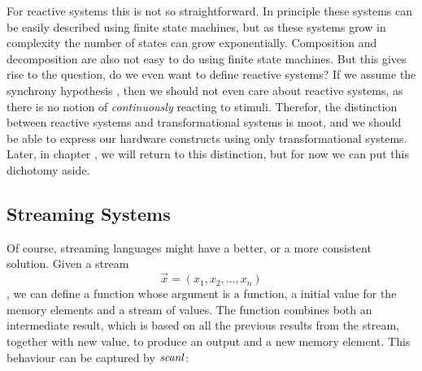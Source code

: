For reactive systems this is not so straightforward.
In principle these systems can be easily described using finite state machines, but as these systems grow in complexity the number of states can grow exponentially.
Composition and decomposition are also not easy to do using finite state machines.
But this gives rise to the question, do we even want to define reactive systems?
If we assume the synchrony hypothesis , then we should not even care about reactive systems, as there is no notion of \textit{continuously} reacting to stimuli.
Therefor, the distinction between reactive systems and transformational systems is moot, and we should be able to express our hardware constructs using only transformational systems.
Later, in chapter , we will return to this distinction, but for now we can put this dichotomy aside.

\subsection{Streaming Systems}
Of course, streaming languages might have a better, or a more consistent solution. 
Given a stream \[\vec x = (x_1,x_2,\ldots,x_n)\], we can define a function whose argument is a function, a initial value for the memory elements and a stream of values.
The function combines both an intermediate result, which is based on all the previous results from the stream, together with new value, to produce an output and a new memory element.
This behaviour can be captured by \ensuremath{\Varid{scanl}}:

